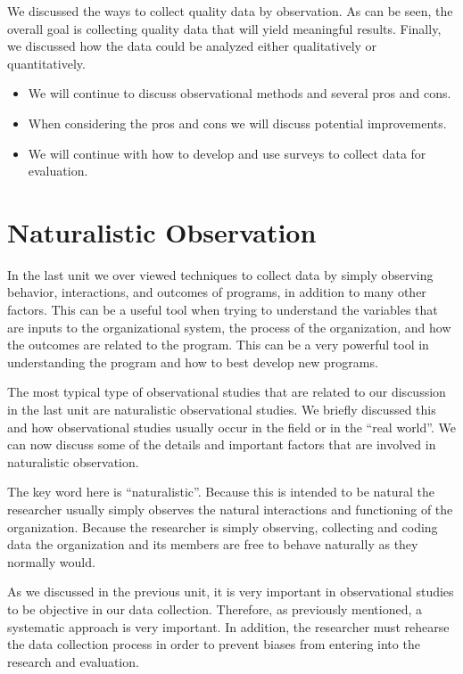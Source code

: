 \documentclass[]{book}
\providecommand{\tightlist}{%
  \setlength{\itemsep}{0pt}\setlength{\parskip}{0pt}}
\theoremstyle{definition}
\theoremstyle{definition}
\theoremstyle{definition}
\theoremstyle{remark}
\begin{document}
We discussed the ways to collect quality data by observation. As can be
seen, the overall goal is collecting quality data that will yield
meaningful results. Finally, we discussed how the data could be analyzed
either qualitatively or quantitatively.

\begin{itemize}
\tightlist
\item
  We will continue to discuss observational methods and several pros and
  cons.
\item
  When considering the pros and cons we will discuss potential
  improvements.
\item
  We will continue with how to develop and use surveys to collect data
  for evaluation.
\end{itemize}

\hypertarget{naturalistic-observation}{%
\section{Naturalistic Observation}\label{naturalistic-observation}}

In the last unit we over viewed techniques to collect data by simply
observing behavior, interactions, and outcomes of programs, in addition
to many other factors. This can be a useful tool when trying to
understand the variables that are inputs to the organizational system,
the process of the organization, and how the outcomes are related to the
program. This can be a very powerful tool in understanding the program
and how to best develop new programs.

The most typical type of observational studies that are related to our
discussion in the last unit are naturalistic observational studies. We
briefly discussed this and how observational studies usually occur in
the field or in the ``real world''. We can now discuss some of the
details and important factors that are involved in naturalistic
observation.

The key word here is ``naturalistic''. Because this is intended to be
natural the researcher usually simply observes the natural interactions
and functioning of the organization. Because the researcher is simply
observing, collecting and coding data the organization and its members
are free to behave naturally as they normally would.

As we discussed in the previous unit, it is very important in
observational studies to be objective in our data collection. Therefore,
as previously mentioned, a systematic approach is very important. In
addition, the researcher must rehearse the data collection process in
order to prevent biases from entering into the research and evaluation.
\end{document}
